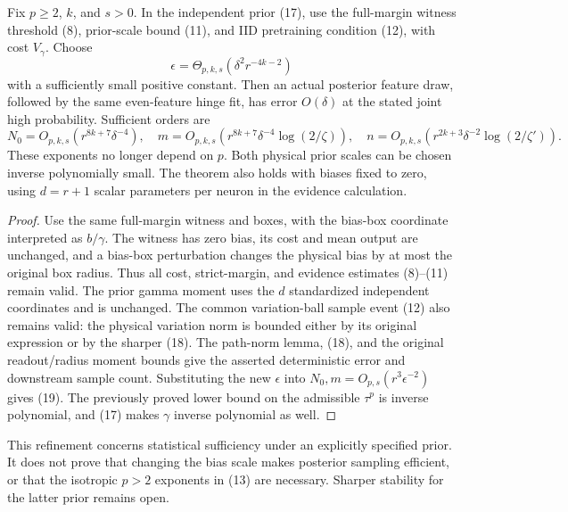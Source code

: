 \begin{theorem}
Fix $p\ge2$, $k$, and $s>0$. In the independent prior (17), use the
full-margin witness threshold (8), prior-scale bound (11), and IID
pretraining condition (12), with cost $V_\gamma$. Choose
\[
 \epsilon=\Theta_{p,k,s}(\delta^2r^{-4k-2})
\]
with a sufficiently small positive constant. Then an actual posterior
feature draw, followed by the same even-feature hinge fit, has error
$O(\delta)$ at the stated joint high probability. Sufficient orders are
\[
 N_0=O_{p,k,s}(r^{8k+7}\delta^{-4}),\quad
 m=O_{p,k,s}(r^{8k+7}\delta^{-4}\log(2/\zeta)),\quad
 n=O_{p,k,s}(r^{2k+3}\delta^{-2}\log(2/\zeta')).       \tag{19}
\]
These exponents no longer depend on $p$. Both physical prior scales can
be chosen inverse polynomially small. The theorem also holds with biases
fixed to zero, using $d=r+1$ scalar parameters per neuron in the evidence
calculation.
\end{theorem}
\begin{proof}
Use the same full-margin witness and boxes, with the bias-box coordinate
interpreted as $b/\gamma$. The witness has zero bias, its cost and mean
output are unchanged, and a bias-box perturbation changes the physical
bias by at most the original box radius. Thus all cost, strict-margin,
and evidence estimates (8)--(11) remain valid. The prior gamma moment
uses the $d$ standardized independent coordinates and is unchanged.
The common variation-ball sample event (12) also remains valid: the
physical variation norm is bounded either by its original expression or
by the sharper (18). The path-norm lemma, (18), and the original
readout/radius moment bounds give the asserted deterministic error and
downstream sample count. Substituting the new $\epsilon$ into
$N_0,m=O_{p,s}(r^3\epsilon^{-2})$ gives (19).
The previously proved lower bound on the admissible $\tau^p$ is inverse
polynomial, and (17) makes $\gamma$ inverse polynomial as well.
\end{proof}

This refinement concerns statistical sufficiency under an explicitly
specified prior. It does not prove that changing the bias scale makes
posterior sampling efficient, or that the isotropic $p>2$ exponents in
(13) are necessary. Sharper stability for the latter prior remains open.
